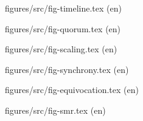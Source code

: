 \documentclass[11pt,a4paper]{report}
\providecommand{\probelang}{en}
\begin{document}
\thesisnames

\newcommand{\probe}[1]{%
  \begin{center}
    {\ttfamily\small figures/src/#1.tex \quad(\probelang)}\par\vspace{6mm}
    
  \end{center}
  \clearpage}

\probe{fig-timeline}
\probe{fig-quorum}
\probe{fig-scaling}
\probe{fig-synchrony}
\probe{fig-equivocation}
\probe{fig-smr}
\end{document}
